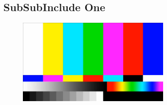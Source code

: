 \subsection{SubSubInclude One}

\lipsum[8]

\begin{figure}%
\includegraphics[width = 3in]{Test_card.png}%
\end{figure}